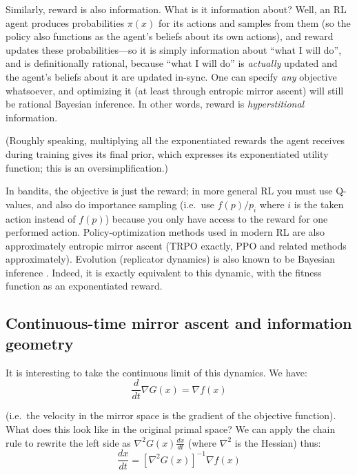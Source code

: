 Similarly, reward is also information. What is it information about?
Well, an RL agent produces probabilities $\pi(x)$ for its actions and samples from them (so
the policy also functions as the agent's beliefs about its own actions), and reward updates
these probabilities---so it is simply information about ``what I will do'', and is
definitionally rational, because ``what I will do'' is \emph{actually} updated and the
agent's beliefs about it are updated in-sync. One can specify \emph{any} objective
whatsoever, and optimizing it (at least through entropic mirror ascent) will still be
rational Bayesian inference. In other words, reward is \emph{hyperstitional} information.

(Roughly speaking, multiplying all the exponentiated rewards the agent receives during
training gives its final prior, which expresses its exponentiated utility function; this
is an oversimplification.)

In bandits, the objective is just the reward; in more general RL you must use Q-values, and
also do importance sampling (i.e.\ use $f(p)/p_i$ where $i$ is the taken action instead of
$f(p)$) because you only have access to the reward for one performed action. Policy-optimization
methods used in modern RL are also approximately entropic mirror ascent (TRPO exactly, PPO
and related methods approximately). Evolution (replicator dynamics) is also known to be Bayesian
inference \citep[explained by][]{harperReplicatorEquationInference2009, baezInformationGeometryPart92012}. Indeed, it is exactly equivalent to this dynamic, with the fitness function as
an exponentiated reward.

\subsection{Continuous-time mirror ascent and information geometry}\label{agency:sec:infogeom}

It is interesting to take the continuous limit of this dynamics. We have:
\[\frac{d}{dt}\nabla G(x)= \nabla f(x)\]

(i.e.\ the velocity in the mirror space is the gradient of the objective function). What
does this look like in the original primal space? We can apply the chain rule to
rewrite the left side as $\nabla^2 G(x)\frac{dx}{dt}$ (where $\nabla^2$ is the Hessian)
thus:
\begin{equation}
\frac{dx}{dt}=[\nabla^2 G(x)]^{-1}\nabla f(x)\label{agency:eq:md-flow}
\end{equation}

